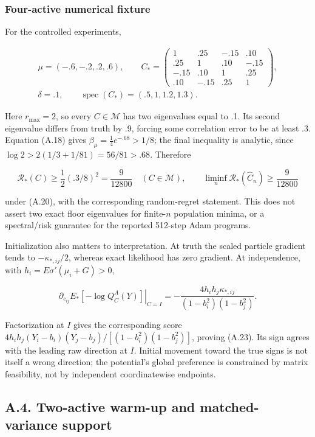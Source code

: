 \documentclass{article}
\begin{document}
\subsubsection*{Four-active numerical
fixture}\label{four-active-numerical-fixture}

For the controlled experiments,

\[
\begin{gathered}
\mu=(-.6,-.2,.2,.6),\qquad
C_*=\begin{pmatrix}
1&.25&-.15&.10\\.25&1&.10&-.15\\
-.15&.10&1&.25\\.10&-.15&.25&1
\end{pmatrix},\\
\delta=.1,\qquad
\operatorname{spec}(C_*)=(.5,1,1.2,1.3).
\end{gathered}
\tag{A.21}
\]

Here \(r_{\max}=2\), so every \(C\in\mathcal M\) has two eigenvalues
equal to .1. Its second eigenvalue differs from truth by .9, forcing
some correlation error to be at least .3. Equation (A.18) gives
\(\beta_\mu=\tfrac14e^{-.68}>1/8\); the final inequality is analytic,
since \(\log2>2(1/3+1/81)=56/81>.68\). Therefore

\[
\mathcal R_*(C)\ge\frac12(.3/8)^2=\frac9{12800}
\quad(C\in\mathcal M),
\qquad
\liminf_n\mathcal R_*(\widehat C_n)\ge\frac9{12800}
\tag{A.22}
\]

under (A.20), with the corresponding random-regret statement. This does
not assert two exact floor eigenvalues for finite-\(n\) population
minima, or a spectral/risk guarantee for the reported 512-step Adam
programs.

Initialization also matters to interpretation. At truth the scaled
particle gradient tends to \(-\kappa_{*,ij}/2\), whereas exact
likelihood has zero gradient. At independence, with
\(h_i=E\sigma'(\mu_i+G)>0\),

\[
\left.\partial_{c_{ij}}E_*[-\log Q_C^A(Y)]\right|_{C=I}
=-\frac{4h_ih_j\kappa_{*,ij}}{(1-b_i^2)(1-b_j^2)} .
\tag{A.23}
\]

Factorization at \(I\) gives the corresponding score
\(4h_ih_j(Y_i-b_i)(Y_j-b_j)/[(1-b_i^2)(1-b_j^2)]\), proving (A.23). Its
sign agrees with the leading raw direction at \(I\). Initial movement
toward the true signs is not itself a wrong direction; the potential's
global preference is constrained by matrix feasibility, not by
independent coordinatewise endpoints.

\subsection*{A.4. Two-active warm-up and matched-variance
support}\label{a.4.-two-active-warm-up-and-matched-variance-support}
\end{document}

